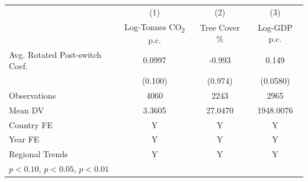 \begin{tabular}{l*{3}{c}}
\hline
            &\multicolumn{1}{c}{(1)}&\multicolumn{1}{c}{(2)}&\multicolumn{1}{c}{(3)}\\
            &\multicolumn{1}{c}{Log-Tonnes CO\textsubscript{2} p.c.}&\multicolumn{1}{c}{Tree Cover \%}&\multicolumn{1}{c}{Log-GDP p.c.}\\
\hline
Avg. Rotated Post-switch Coef.&      0.0997         &      -0.993         &       0.149\sym{**} \\
            &     (0.100)         &     (0.974)         &    (0.0580)         \\
\midrule
Observations&        4060         &        2243         &        2965         \\
Mean DV     &      3.3605         &     27.0470         &   1948.0076         \\
Country FE  &           Y         &           Y         &           Y         \\
Year FE     &           Y         &           Y         &           Y         \\
Regional Trends&           Y         &           Y         &           Y         \\
\hline
\multicolumn{4}{l}{\footnotesize \sym{*} \(p<0.10\), \sym{**} \(p<0.05\), \sym{***} \(p<0.01\)}\\
\end{tabular}
